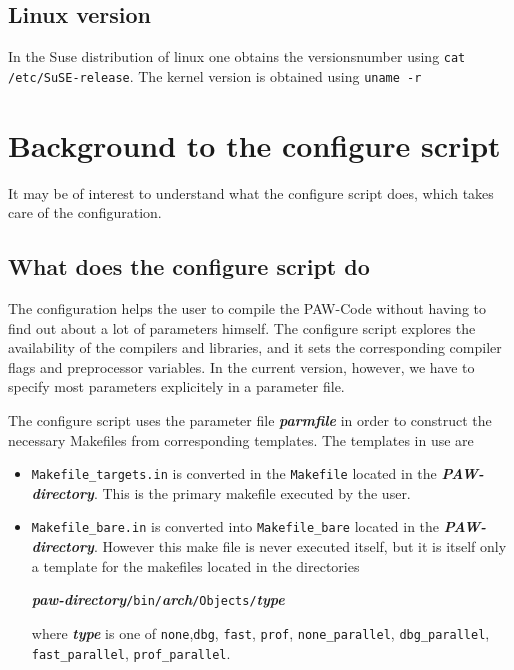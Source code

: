 \documentclass[a4paper,10pt]{report}
\newcommand{\myspec}[1]{\textbf{\textit{#1}}}
\newcommand{\mytt}[1]{{\tt #1}}
\begin{document}
\subsection{Linux version}
In the Suse distribution of linux one obtains the versionsnumber using
\verb+cat /etc/SuSE-release+.  The kernel version is obtained using
\verb+uname -r+

\section{Background to the configure script}
\label{sec:configurebackground}
It may be of interest to understand what the configure script does,
which takes care of the configuration.

\subsection{What does the configure script do}
The configuration helps the user to compile the PAW-Code without
having to find out about a lot of parameters himself.  The configure
script explores the availability of the compilers and libraries, and
it sets the corresponding compiler flags and preprocessor
variables. In the current version, however, we have to specify most
parameters explicitely in a parameter file.

The configure script uses the parameter file \myspec{parmfile} in
order to construct the necessary Makefiles from corresponding
templates. The templates in use are
\begin{itemize}
\item \mytt{Makefile\_targets.in} is converted in the \mytt{Makefile}
located in the \myspec{PAW-directory}. This is the primary makefile
executed by the user.
\item \mytt{Makefile\_bare.in} is converted into \mytt{Makefile\_bare}
located in the \myspec{PAW-directory}. However this make file is never
executed itself, but it is itself only a template for the makefiles located in the directories
\begin{center}
\myspec{paw-directory}\mytt{/bin/}\myspec{arch}\mytt{/Objects/}\myspec{type}
\end{center}
where \myspec{type} is one of \mytt{none},\mytt{dbg}, \mytt{fast},
\mytt{prof}, \mytt{none\_parallel}, \mytt{dbg\_parallel},
\mytt{fast\_parallel}, \mytt{prof\_parallel}.
\end{itemize}
\end{document}

